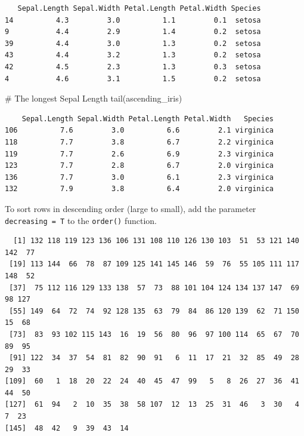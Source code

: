 \documentclass[
  letterpaper,
  DIV=11,
  numbers=noendperiod]{scrreprt}
\newenvironment{Shaded}{\begin{snugshade}}{\end{snugshade}}
\newcommand{\AttributeTok}[1]{\textcolor[rgb]{0.40,0.45,0.13}{#1}}
\newcommand{\CommentTok}[1]{\textcolor[rgb]{0.37,0.37,0.37}{#1}}
\newcommand{\FunctionTok}[1]{\textcolor[rgb]{0.28,0.35,0.67}{#1}}
\newcommand{\NormalTok}[1]{\textcolor[rgb]{0.00,0.23,0.31}{#1}}
\newcommand{\OtherTok}[1]{\textcolor[rgb]{0.00,0.23,0.31}{#1}}
\newcommand{\SpecialCharTok}[1]{\textcolor[rgb]{0.37,0.37,0.37}{#1}}
\begin{document}
\begin{verbatim}
   Sepal.Length Sepal.Width Petal.Length Petal.Width Species
14          4.3         3.0          1.1         0.1  setosa
9           4.4         2.9          1.4         0.2  setosa
39          4.4         3.0          1.3         0.2  setosa
43          4.4         3.2          1.3         0.2  setosa
42          4.5         2.3          1.3         0.3  setosa
4           4.6         3.1          1.5         0.2  setosa
\end{verbatim}

\begin{Shaded}
\begin{Highlighting}[]
\CommentTok{\# The longest Sepal Length}
\FunctionTok{tail}\NormalTok{(ascending\_iris)}
\end{Highlighting}
\end{Shaded}

\begin{verbatim}
    Sepal.Length Sepal.Width Petal.Length Petal.Width   Species
106          7.6         3.0          6.6         2.1 virginica
118          7.7         3.8          6.7         2.2 virginica
119          7.7         2.6          6.9         2.3 virginica
123          7.7         2.8          6.7         2.0 virginica
136          7.7         3.0          6.1         2.3 virginica
132          7.9         3.8          6.4         2.0 virginica
\end{verbatim}

To sort rows in descending order (large to small), add the parameter
\texttt{decreasing\ =\ T} to the \texttt{order()} function.

\begin{Shaded}
\end{Shaded}

\begin{verbatim}
  [1] 132 118 119 123 136 106 131 108 110 126 130 103  51  53 121 140 142  77
 [19] 113 144  66  78  87 109 125 141 145 146  59  76  55 105 111 117 148  52
 [37]  75 112 116 129 133 138  57  73  88 101 104 124 134 137 147  69  98 127
 [55] 149  64  72  74  92 128 135  63  79  84  86 120 139  62  71 150  15  68
 [73]  83  93 102 115 143  16  19  56  80  96  97 100 114  65  67  70  89  95
 [91] 122  34  37  54  81  82  90  91   6  11  17  21  32  85  49  28  29  33
[109]  60   1  18  20  22  24  40  45  47  99   5   8  26  27  36  41  44  50
[127]  61  94   2  10  35  38  58 107  12  13  25  31  46   3  30   4   7  23
[145]  48  42   9  39  43  14
\end{verbatim}
\end{document}
